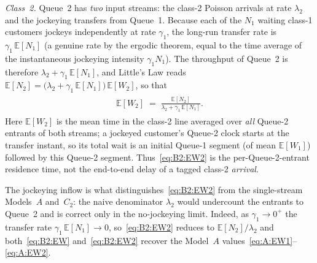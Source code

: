 \emph{Class~2.} Queue~2 has \emph{two} input streams: the class-2 Poisson arrivals at rate
$\lambda_2$ and the jockeying transfers from Queue~1. Because each of the $N_1$ waiting
class-1 customers jockeys independently at rate $\gamma_1$, the long-run transfer rate is
$\gamma_1\,\mathbb{E}[N_1]$ (a genuine rate by the ergodic theorem, equal to the time
average of the instantaneous jockeying intensity $\gamma_1 N_1$). The throughput of Queue~2
is therefore $\lambda_2+\gamma_1\,\mathbb{E}[N_1]$, and Little's Law reads
$\mathbb{E}[N_2]=\bigl(\lambda_2+\gamma_1\,\mathbb{E}[N_1]\bigr)\,\mathbb{E}[W_2]$, so that
\begin{align}
    \begin{split}
        \mathbb{E}[W_2] \;=\; \frac{\mathbb{E}[N_2]}{\lambda_2+\gamma_1\,\mathbb{E}[N_1]}.
    \end{split}
    \label{eq:B2:EW2}
\end{align}
Here $\mathbb{E}[W_2]$ is the mean time in the class-2 line averaged over \emph{all} Queue-2
entrants of both streams; a jockeyed customer's Queue-2 clock starts at the transfer
instant, so its total wait is an initial Queue-1 segment (of mean $\mathbb{E}[W_1]$) followed
by this Queue-2 segment. Thus~\eqref{eq:B2:EW2} is the per-Queue-2-entrant residence time,
not the end-to-end delay of a tagged class-2 \emph{arrival}.

The jockeying inflow is what distinguishes~\eqref{eq:B2:EW2} from the single-stream
Models~$A$ and~$C_2$: the naive denominator $\lambda_2$ would undercount the entrants to
Queue~2 and is correct only in the no-jockeying limit. Indeed, as $\gamma_1\to0^{+}$ the
transfer rate $\gamma_1\,\mathbb{E}[N_1]\to0$, so~\eqref{eq:B2:EW2} reduces to
$\mathbb{E}[N_2]/\lambda_2$ and both~\eqref{eq:B2:EW} and~\eqref{eq:B2:EW2} recover the
Model~$A$ values~\eqref{eq:A:EW1}--\eqref{eq:A:EW2}.
